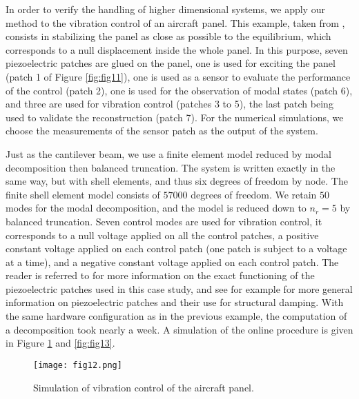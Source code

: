  
 In order to verify the handling of higher dimensional systems, we apply our method to the vibration
 control of an aircraft panel. This example, taken from \cite{ji2014semi}, consists in 
 stabilizing the panel as close as possible to the equilibrium, which corresponds to 
 a null displacement inside the whole panel. In this purpose, 
 seven piezoelectric patches are glued on the panel, one is used for exciting the panel (patch 1 of Figure \ref{fig:fig11}),
 one is used as a sensor to evaluate the performance of the control (patch 2), one is used for the 
 observation of modal states (patch 6), and three are used for vibration control (patches 3 to 5), the last patch being
 used to validate the reconstruction (patch 7). For the numerical simulations, we choose the measurements 
 of the sensor patch as the output of the system. 
 
 Just as the cantilever beam, we use a finite element model reduced by modal decomposition
 then balanced truncation. The system is written exactly in the same way, 
 but with shell elements, and thus six degrees of freedom by node.
 The finite shell element model consists of $57000$ degrees 
 of freedom. We retain $50$ modes for the modal decomposition, and the model is reduced down to 
 $n_r = 5$ by balanced truncation. 
 Seven control modes are used for vibration control, it corresponds to a null voltage applied 
 on all the control patches, a positive constant voltage applied on each control patch
  (one patch is subject to a voltage at a time), and a negative
 constant voltage applied on each control patch. The reader is referred to \cite{ji2014semi} for more
 information on the exact functioning of the piezoelectric patches used in this
 case study, and see for example \cite{hagood1991,moheimani2006} for more general information
 on piezoelectric patches and their use for structural damping.
 With the same hardware configuration as in the previous example, the computation 
 of a decomposition took nearly a week. A simulation of the online procedure 
 is given in Figure \ref{fig:fig12} and \ref{fig:fig13}. 
 

 \begin{figure}[ht]
  \texttt{[image: fig12.png]}
  \caption{Simulation of vibration control of the aircraft panel.}
  \label{fig:fig12}
 \end{figure}
 
